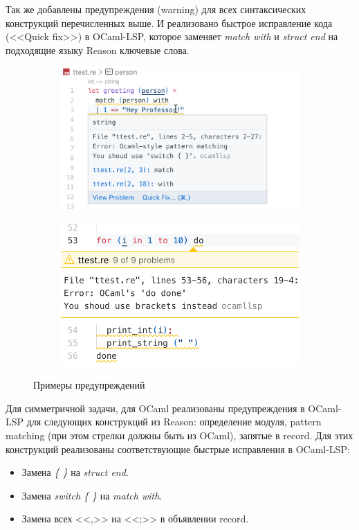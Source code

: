 Так же добавлены предупреждения (warning) для всех синтаксических конструкций перечисленных выше. И реализовано быстрое исправление кода (<<Quick fix>>) в OCaml-LSP, которое заменяет {\it match with} и {\it struct end} на подходящие языку Reason ключевые слова.
\begin{figure}[h]
\begin{subfigure}{0.5\textwidth}
	\includegraphics[width=\linewidth]{screenshots/05.png}
\end{subfigure}
\begin{subfigure}{0.5\textwidth}
	\includegraphics[width=\linewidth]{screenshots/06.png}
\end{subfigure}
\caption{Примеры предупреждений}
\end{figure}

\newpage
Для симметричной задачи, для OCaml реализованы предупреждения в OCaml-LSP для следующих конструкций из Reason: определение модуля, pattern matching (при этом стрелки должны быть из OCaml), запятые в record. Для этих конструкций реализованы соответствующие быстрые исправления в OCaml-LSP:
\begin{itemize}

\item Замена {\it \{ \}} на {\it struct end}.

\item Замена {\it switch \{ \}} на {\it match with}.

\item Замена всех <<,>> на <<;>> в объявлении record.

\end{itemize}

